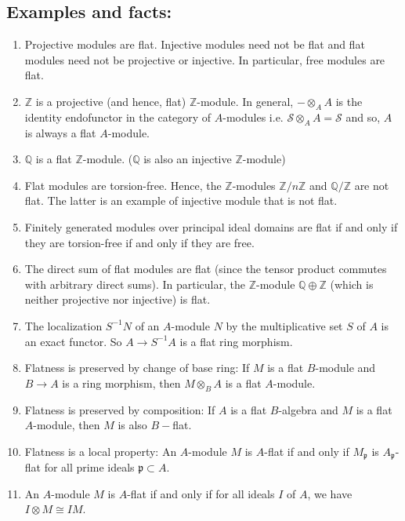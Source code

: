 \documentclass[12pt]{article}
\theoremstyle{mytheoremstyle}
\newcommand{\bZ}{\mathbb{Z}}
\newcommand{\bQ}{\mathbb{Q}}
\newcommand{\cS}{\mathcal{S}}
\begin{document}
\subsection*{Examples and facts:}
\begin{enumerate}
    \item Projective modules are flat. Injective modules need not be flat
          and flat modules need not be projective or injective. In particular,
          free modules are flat.
    \item $\mathbb{Z}$ is a projective (and hence, flat) $\bZ$-module.
          In general, $-\otimes_A A$ is the identity endofunctor in
          the category of $A$-modules
          i.e. $\cS\otimes_A A = \cS$ and so,
          $A$ is always a flat $A$-module.
    \item $\bQ$ is a flat $\bZ$-module. ($\bQ$ is also an injective
          $\bZ$-module)
    \item Flat modules are torsion-free. Hence, the $\bZ$-modules
          $\bZ/n\bZ$ and $\bQ/\bZ$ are not flat. The latter is an example
          of injective module that is not flat.
    \item Finitely generated modules over principal ideal domains are
          flat if and only if they are torsion-free if and only if they
          are free.
    \item The direct sum of flat modules are flat (since the tensor
          product commutes with arbitrary direct sums). In particular,
          the $\bZ$-module $\bQ\oplus\bZ$ (which is neither projective
          nor injective) is flat.
    \item The localization $S^{-1}N$ of an $A$-module $N$ by the multiplicative
          set $S$ of $A$ is an exact functor. So $A\to S^{-1}A$ is a flat ring
          morphism.
    \item Flatness is preserved by change of base ring:
          If $M$ is a flat $B$-module and $B\to A$ is a ring morphism,
          then $M\otimes_B A$ is a flat $A$-module.
    \item Flatness is preserved by composition:
          If $A$ is a flat $B$-algebra and $M$ is a flat $A$-module, then
          $M$ is also $B-$flat.
    \item Flatness is a local property:
          An $A$-module $M$ is $A$-flat if and only if $M_\mathfrak{p}$
          is $A_\mathfrak{p}$-flat for all prime ideals $\mathfrak{p}
              \subset A$.
    \item An $A$-module $M$ is $A$-flat if and only if for all ideals $I$
          of $A$, we have $I\otimes M\cong IM$.
\end{enumerate}
\end{document}
